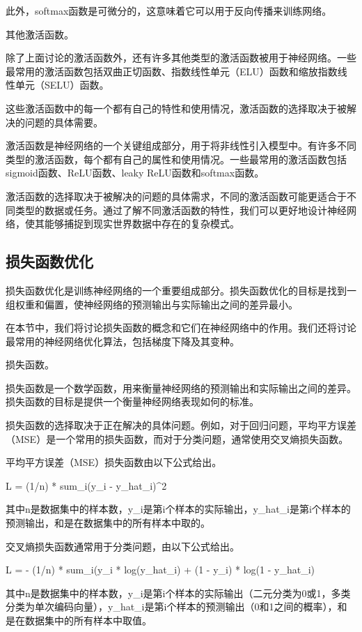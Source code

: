 此外，softmax函数是可微分的，这意味着它可以用于反向传播来训练网络。

其他激活函数。

除了上面讨论的激活函数外，还有许多其他类型的激活函数被用于神经网络。一些最常用的激活函数包括双曲正切函数、指数线性单元（ELU）函数和缩放指数线性单元（SELU）函数。

这些激活函数中的每一个都有自己的特性和使用情况，激活函数的选择取决于被解决的问题的具体需要。

激活函数是神经网络的一个关键组成部分，用于将非线性引入模型中。有许多不同类型的激活函数，每个都有自己的属性和使用情况。一些最常用的激活函数包括sigmoid函数、ReLU函数、leaky ReLU函数和softmax函数。

激活函数的选择取决于被解决的问题的具体需求，不同的激活函数可能更适合于不同类型的数据或任务。通过了解不同激活函数的特性，我们可以更好地设计神经网络，使其能够捕捉到现实世界数据中存在的复杂模式。


\subsection{损失函数优化}

损失函数优化是训练神经网络的一个重要组成部分。损失函数优化的目标是找到一组权重和偏置，使神经网络的预测输出与实际输出之间的差异最小。

在本节中，我们将讨论损失函数的概念和它们在神经网络中的作用。我们还将讨论最常用的神经网络优化算法，包括梯度下降及其变种。

损失函数。

损失函数是一个数学函数，用来衡量神经网络的预测输出和实际输出之间的差异。损失函数的目标是提供一个衡量神经网络表现如何的标准。

损失函数的选择取决于正在解决的具体问题。例如，对于回归问题，平均平方误差（MSE）是一个常用的损失函数，而对于分类问题，通常使用交叉熵损失函数。

平均平方误差（MSE）损失函数由以下公式给出。

L = (1/n) * sum_i(y_i - y_hat_i)^2

其中n是数据集中的样本数，y_i是第i个样本的实际输出，y_hat_i是第i个样本的预测输出，和是在数据集中的所有样本中取的。

交叉熵损失函数通常用于分类问题，由以下公式给出。

L = - (1/n) * sum_i(y_i * log(y_hat_i) + (1 - y_i) * log(1 - y_hat_i)

其中n是数据集中的样本数，y_i是第i个样本的实际输出（二元分类为0或1，多类分类为单次编码向量），y_hat_i是第i个样本的预测输出（0和1之间的概率），和是在数据集中的所有样本中取值。

